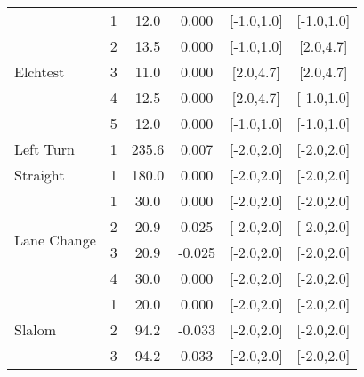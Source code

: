 \begin{longtable}{l c c c c c}
	\multirow{5}{*}{Elchtest}         & 1                & 12.0            & 0.000              & [-1.0,1.0]                              & [-1.0,1.0]   \\
	                                  & 2                & 13.5            & 0.000              & [-1.0,1.0]                              & [2.0,4.7]    \\
	                                  & 3                & 11.0            & 0.000              & [2.0,4.7]                               & [2.0,4.7]    \\
	                                  & 4                & 12.5            & 0.000              & [2.0,4.7]                               & [-1.0,1.0]   \\
	                                  & 5                & 12.0            & 0.000              & [-1.0,1.0]                              & [-1.0,1.0]   \\
	\midrule
	\multirow{1}{*}{Left Turn}        & 1                & 235.6           & 0.007              & [-2.0,2.0]                              & [-2.0,2.0]   \\
	\midrule
	\multirow{1}{*}{Straight}         & 1                & 180.0           & 0.000              & [-2.0,2.0]                              & [-2.0,2.0]   \\
	\midrule
	\multirow{4}{*}{Lane Change}      & 1                & 30.0            & 0.000              & [-2.0,2.0]                              & [-2.0,2.0]   \\
	                                  & 2                & 20.9            & 0.025              & [-2.0,2.0]                              & [-2.0,2.0]   \\
	                                  & 3                & 20.9            & -0.025             & [-2.0,2.0]                              & [-2.0,2.0]   \\
	                                  & 4                & 30.0            & 0.000              & [-2.0,2.0]                              & [-2.0,2.0]   \\
	\midrule
	\multirow{5}{*}{Slalom}           & 1                & 20.0            & 0.000              & [-2.0,2.0]                              & [-2.0,2.0]   \\
	                                  & 2                & 94.2            & -0.033             & [-2.0,2.0]                              & [-2.0,2.0]   \\
	                                  & 3                & 94.2            & 0.033              & [-2.0,2.0]                              & [-2.0,2.0]   \\

\end{longtable}
